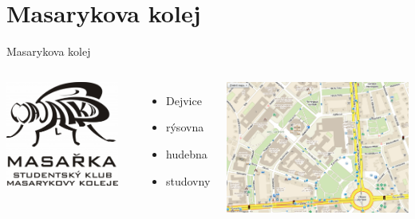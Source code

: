 \documentclass{beamer}
\begin{document}
\section{Masarykova kolej}
\begin{frame}{Masarykova kolej}
	\begin{columns}[c]
			\begin{center}
				\includegraphics[width=0.9\textwidth]{logo_mk.png}
			\end{center}

			\begin{itemize}
				\item Dejvice
				\item rýsovna
				\item hudebna
				\item studovny
			\end{itemize}
			\begin{center}
				\includegraphics[width=\textwidth]{mapa_all.png}
			\end{center}
	\end{columns}

\end{frame}
\end{document}

